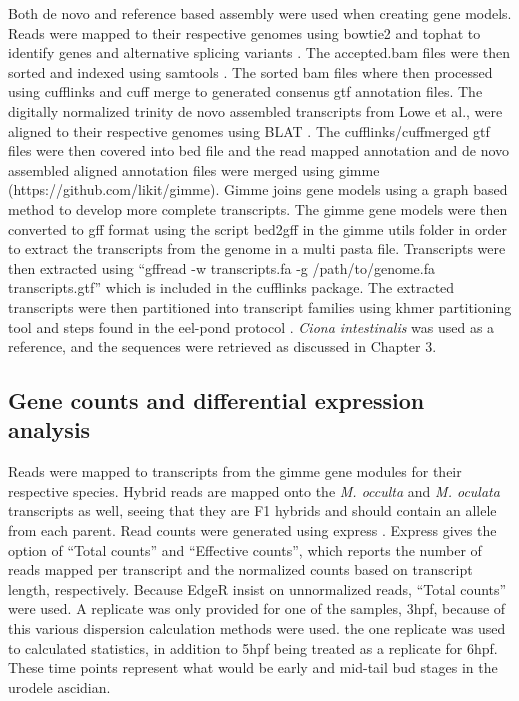 Both de novo and reference based assembly were used when creating gene models. Reads were mapped to their respective genomes using bowtie2 and tophat to identify genes and alternative splicing variants \cite{langmead_fast_2012,trapnell_differential_2012}. The accepted.bam files were then sorted and indexed using samtools \cite{li_sequence_2009}. The sorted bam files where then processed using cufflinks and cuff merge to generated consenus gtf annotation files. The digitally normalized trinity de novo assembled transcripts from Lowe et al., were aligned to their respective genomes using BLAT \cite{haas_novo_2013}. The cufflinks/cuffmerged gtf files were then covered into bed file and the read mapped annotation and de novo assembled aligned annotation files were merged using gimme (https://github.com/likit/gimme). Gimme joins gene models using a graph based method to develop more complete transcripts. The gimme gene models were then converted to gff format using the script bed2gff in the gimme utils folder in order to extract the transcripts from the genome in a multi pasta file. Transcripts were then extracted using ``gffread -w transcripts.fa -g /path/to/genome.fa transcripts.gtf'' which is included in the cufflinks package. The extracted transcripts were then partitioned into transcript families using khmer partitioning tool and steps found in the eel-pond protocol \cite{}. \textit{Ciona intestinalis} was used as a reference, and the sequences were retrieved as discussed in Chapter 3. 

\subsection{Gene counts and differential expression analysis}
Reads were mapped to transcripts from the gimme gene modules for their respective species. Hybrid reads are mapped onto the \textit{M. occulta} and \textit{M. oculata} transcripts as well, seeing that they are F1 hybrids and should contain an allele from each parent. Read counts were generated using express \cite{}. Express gives the option of ``Total counts'' and ``Effective counts'', which reports the number of reads mapped per transcript and the normalized counts based on transcript length, respectively. Because EdgeR insist on unnormalized reads, ``Total counts'' were used. A replicate was only provided for one of the samples, 3hpf, because of this various dispersion calculation methods were used. the one replicate was used to calculated statistics, in addition to 5hpf being treated as a replicate for 6hpf. These time points represent what would be early and mid-tail bud stages in the urodele ascidian. 

